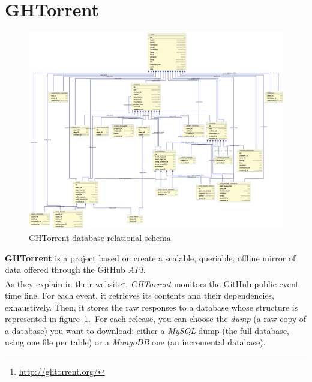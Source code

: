 \documentclass[a4paper, 12pt]{book}
\begin{document}
\section{GHTorrent}
\label{sec:ghtorrent}
\begin{figure}
  \centering
  \includegraphics[width=16cm, keepaspectratio]{img/ghtorrent-schema}
  \caption{GHTorrent database relational schema}
  \label{fig:ghtorrent-schema}
\end{figure}
\textbf{GHTorrent} is a project based on create a scalable, queriable, offline mirror of data offered through the GitHub \textit{API}.\\
As they explain in their website\footnote{\url{http://ghtorrent.org/}}, \emph{GHTorrent} monitors the GitHub public event time line.
For each event, it retrieves its contents and their dependencies, exhaustively. Then, it stores the raw responses to a database whose
structure is represented in figure~\ref{fig:ghtorrent-schema}.\
For each release, you can choose the \textit{dump} (a raw copy of a database) you want to download: either a \emph{MySQL} dump
(the full database, using one file per table) or a \emph{MongoDB} one (an incremental database).\\
\end{document}
